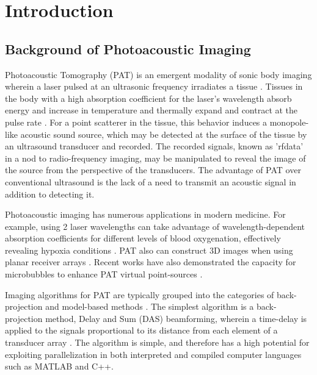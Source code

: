 \chapter{Introduction} 
\label{chapter1:introduction}
\graphicspath{{Chapter-1/graphics/}}

\section{Background of Photoacoustic Imaging}
\label{chapter1:backg_photoacoustics}

Photoacoustic Tomography (PAT) is an emergent modality of sonic body imaging wherein a laser pulsed at an ultrasonic frequency irradiates a tissue \cite{xuPhotoacousticImagingBiomedicine2006}. Tissues in the body with a high absorption coefficient for the laser's wavelength absorb energy and increase in temperature and thermally expand and contract at the pulse rate \cite{xuPhotoacousticImagingBiomedicine2006}\cite{wangProspectsPhotoacousticTomography2008}. For a point scatterer in the tissue, this behavior induces a monopole-like acoustic sound source, which may be detected at the surface of the tissue by an ultrasound transducer and recorded. The recorded signals, known as 'rfdata' in a nod to radio-frequency imaging, may be manipulated to reveal the image of the source from the perspective of the transducers. The advantage of PAT over conventional ultrasound is the lack of a need to transmit an acoustic signal in addition to detecting it.

Photoacoustic imaging has numerous applications in modern medicine. For example, using 2 laser wavelengths can take advantage of wavelength-dependent absorption coefficients for different levels of blood oxygenation, effectively revealing hypoxia conditions \cite{liSimultaneousMolecularHypoxia2008}\cite{zhangFunctionalPhotoacousticMicroscopy2006}. PAT also can construct 3D images when using planar receiver arrays \cite{zhangFunctionalPhotoacousticMicroscopy2006}. Recent works have also demonstrated the capacity for microbubbles to enhance PAT virtual point-sources \cite{tangHighfidelityDeepFunctional2023a}.

Imaging algorithms for PAT are typically grouped into the categories of back-projection \cite{xuUniversalBackprojectionAlgorithm2005} and model-based methods \cite{fesslerModelBasedImageReconstruction2010}\cite{dean-benPracticalGuideModelbased2022}. The simplest algorithm is a back-projection method, Delay and Sum (DAS) beamforming, wherein a time-delay is applied to the signals proportional to its distance from each element of a transducer array \cite{perrotYouThinkYou2021a}\cite{mckeighenNewTechniquesDynamically1977}\cite{1686435}\cite{maillouxPhasedArrayTheory1982}. The algorithm is simple, and therefore has a high potential for exploiting parallelization in both interpreted and compiled computer languages such as MATLAB and C++.

